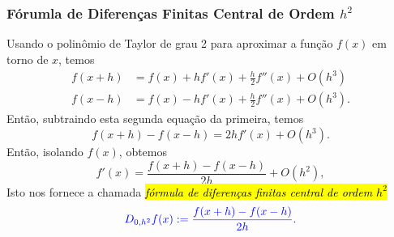 \subsubsection{Fórumla de Diferenças Finitas Central de Ordem $h^2$}

Usando o polinômio de Taylor de grau 2 para aproximar a função $f(x)$ em torno de $x$, temos
\begin{align}
  f(x+h) &= f(x) + hf'(x) + \frac{h}{2}f''(x) + O(h^3)\\
  f(x-h) &= f(x) - hf'(x) + \frac{h}{2}f''(x) + O(h^3).
\end{align}
Então, subtraindo esta segunda equação da primeira, temos
\begin{equation}
  f(x+h)-f(x-h) = 2hf'(x) + O(h^3).
\end{equation}
Então, isolando $f(x)$, obtemos
\begin{equation}
  f'(x) = \frac{f(x+h)-f(x-h)}{2h} + O(h^2),
\end{equation}
Isto nos fornece a chamada \hl{\emph{fórmula de diferenças finitas central de ordem $h^2$}}
\begin{equation}\label{cap_deriv_sec_df:eq:dfc_h2}\color{blue}D_{0,h^2}f(x) := \frac{f(x+h)-f(x-h)}{2h}.
\end{equation}

